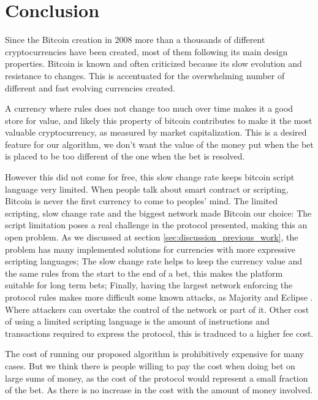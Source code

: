 \section{Conclusion}

Since the Bitcoin creation in 2008 more than a thousands of different
  cryptocurrencies have been created, most of them following its main design
  properties.
Bitcoin is known and often criticized because its slow evolution and resistance
  to changes.
This is accentuated for the overwhelming number of different and fast evolving
  currencies created.

A currency where rules does not change too much over time makes it a good store
  for value, and likely this property of bitcoin contributes to make it the
  most valuable cryptocurrency, as measured by market capitalization.
This is a desired feature for our algorithm, we don't want the value of the
  money put when the bet is placed to be too different of the one when the bet
  is resolved.

However this did not come for free, this slow change rate keeps bitcoin script
  language very limited.
When people talk about smart contract or scripting, Bitcoin is never the first
  currency to come to peoples' mind.
The limited scripting, slow change rate and the biggest network made Bitcoin our
  choice:
The script limitation poses a real challenge in the protocol presented, making this
  an open problem.
As we discussed at section \ref{sec:discussion_previous_work}, the problem has
  many implemented solutions for currencies with more expressive scripting
  languages;
The slow change rate helps to keep the currency value and the same rules from
  the start to the end of a bet, this makes the platform suitable for long term
  bets;
Finally, having the largest network enforcing the protocol rules makes more
  difficult some known attacks, as Majority and Eclipse
  \cite{heilman2015eclipse}.
Where attackers can overtake the control of the network or part of it.
Other cost of using a limited scripting language is the amount of instructions
  and transactions required to express the protocol, this is traduced to a
  higher fee cost.

The cost of running our proposed algorithm is prohibitively expensive for many
  cases.
But we think there is people willing to pay the cost when doing bet on large
  sums of money, as the cost of the protocol would represent a small fraction of
  the bet.
As there is no increase in the cost with the amount of money involved.

